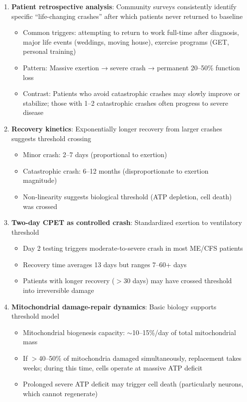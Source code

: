 \begin{enumerate}
    \item \textbf{Patient retrospective analysis}: Community surveys consistently identify specific ``life-changing crashes'' after which patients never returned to baseline
    \begin{itemize}
        \item Common triggers: attempting to return to work full-time after diagnosis, major life events (weddings, moving house), exercise programs (GET, personal training)
        \item Pattern: Massive exertion → severe crash → permanent 20--50\% function loss
        \item Contrast: Patients who avoid catastrophic crashes may slowly improve or stabilize; those with 1--2 catastrophic crashes often progress to severe disease
    \end{itemize}

    \item \textbf{Recovery kinetics}: Exponentially longer recovery from larger crashes suggests threshold crossing
    \begin{itemize}
        \item Minor crash: 2--7 days (proportional to exertion)
        \item Catastrophic crash: 6--12 months (disproportionate to exertion magnitude)
        \item Non-linearity suggests biological threshold (ATP depletion, cell death) was crossed
    \end{itemize}

    \item \textbf{Two-day CPET as controlled crash}: Standardized exertion to ventilatory threshold
    \begin{itemize}
        \item Day 2 testing triggers moderate-to-severe crash in most ME/CFS patients
        \item Recovery time averages 13 days but ranges 7--60+ days~\cite{keller2024cpet}
        \item Patients with longer recovery ($>$30 days) may have crossed threshold into irreversible damage
    \end{itemize}

    \item \textbf{Mitochondrial damage-repair dynamics}: Basic biology supports threshold model
    \begin{itemize}
        \item Mitochondrial biogenesis capacity: $\sim$10--15\%/day of total mitochondrial mass
        \item If $>$40--50\% of mitochondria damaged simultaneously, replacement takes weeks; during this time, cells operate at massive ATP deficit
        \item Prolonged severe ATP deficit may trigger cell death (particularly neurons, which cannot regenerate)
    \end{itemize}
\end{enumerate}

